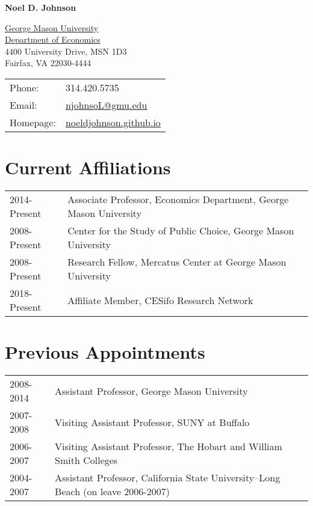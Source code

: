 \documentclass[11pt,fullpage]{article}
\def\name{Noel D. Johnson}
\begin{document}


\centerline{\Large \bf \name}

\vspace{0.25in}

\begin{minipage}{0.50\linewidth}
  \href{http://www.gmu.edu/}{George Mason University} \\
  \href{http://www.gmu.edu/centers/publicchoice/}{Department of Economics} \\
   4400 University Drive, MSN 1D3 \\
  Fairfax, VA 22030-4444
\end{minipage}
\begin{minipage}{0.50\linewidth}
  \begin{tabular}{ll}
    Phone: & 314.420.5735 \\
    Email: & \href{mailto:njohnsoL@gmu.edu}{njohnsoL@gmu.edu} \\
    Homepage: & \href{https://noeldjohnson.github.io}{noeldjohnson.github.io} \\
  \end{tabular}
\end{minipage}

\vspace{.25cm}


\section*{Current Affiliations}

\begin{tabular}{ll}
	2014-Present & Associate Professor, Economics Department, George Mason University \\
	2008-Present & Center for the Study of Public Choice, George Mason University \\
	2008-Present & Research Fellow, Mercatus Center at George Mason University \\
	2018-Present & Affiliate Member, CESifo Research Network \\
\end{tabular}

\section*{Previous Appointments}

\begin{tabular}{ll}
	2008-2014 & Assistant Professor, George Mason University \\
	2007-2008 & Visiting Assistant Professor, SUNY at Buffalo \\
	2006-2007 & Visiting Assistant Professor, The Hobart and William Smith Colleges \\
	2004-2007 & Assistant Professor, California State University--Long Beach (on leave 2006-2007) \\
\end{tabular}
\end{document}
